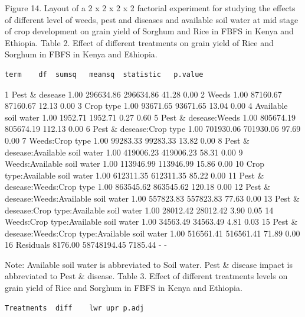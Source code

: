 \documentclass[12pt,oneside]{article}
\begin{document}
Figure 14. Layout of a 2 x 2 x 2 x 2 factorial experiment for studying the effects of different level of weeds, pest and diseases and available soil water at mid stage of crop development on grain yield of Sorghum and Rice in FBFS in Kenya and Ethiopia.
Table 2. Effect of different treatments on grain yield of Rice and Sorghum in FBFS in Kenya and Ethiopia.

\begin{verbatim}
term    df  sumsq   meansq  statistic   p.value
\end{verbatim}

1 Pest \& desease 1.00 296634.86 296634.86 41.28 0.00
2 Weeds 1.00 87160.67 87160.67 12.13 0.00
3 Crop type 1.00 93671.65 93671.65 13.04 0.00
4 Available soil water 1.00 1952.71 1952.71 0.27 0.60
5 Pest \& desease:Weeds 1.00 805674.19 805674.19 112.13 0.00
6 Pest \& desease:Crop type 1.00 701930.06 701930.06 97.69 0.00
7 Weeds:Crop type 1.00 99283.33 99283.33 13.82 0.00
8 Pest \& desease:Available soil water 1.00 419006.23 419006.23 58.31 0.00
9 Weeds:Available soil water 1.00 113946.99 113946.99 15.86 0.00
10 Crop type:Available soil water 1.00 612311.35 612311.35 85.22 0.00
11 Pest \& desease:Weeds:Crop type 1.00 863545.62 863545.62 120.18 0.00
12 Pest \& desease:Weeds:Available soil water 1.00 557823.83 557823.83 77.63 0.00
13 Pest \& desease:Crop type:Available soil water 1.00 28012.42 28012.42 3.90 0.05
14 Weeds:Crop type:Available soil water 1.00 34563.49 34563.49 4.81 0.03
15 Pest \& desease:Weeds:Crop type:Available soil water 1.00 516561.41 516561.41 71.89 0.00
16 Residuals 8176.00 58748194.45 7185.44 - -

Note: Available soil water is abbreviated to Soil water. Pest \& disease impact is abbreviated to Pest \& disease.
Table 3. Effect of different treatments levels on grain yield of Rice and Sorghum in FBFS in Kenya and Ethiopia.

\begin{verbatim}
Treatments  diff    lwr upr p.adj
\end{verbatim}
\end{document}

